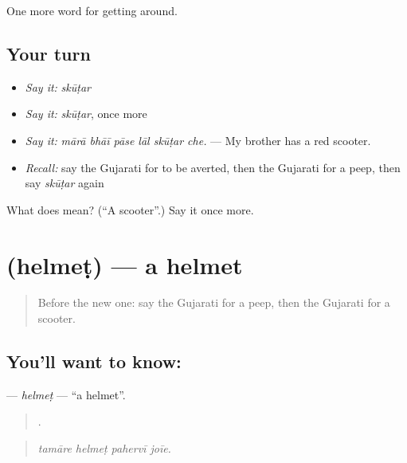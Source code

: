 \begin{grammarlens}[title={What you've built}]
One more word for getting around.
\end{grammarlens}

\subsection*{Your turn}
\begin{itemize}
\raggedright
  \item \emph{Say it:} \emph{skūṭar}
  \item \emph{Say it:} \emph{skūṭar}, once more
  \item \emph{Say it:} \emph{mārā bhāī pāse lāl skūṭar che.} — My brother has a red scooter.
  \item \emph{Recall:} say the Gujarati for to be averted, then the Gujarati for a peep, then say \emph{skūṭar} again
\end{itemize}

\begin{tcolorbox}[breakable,colback=teal!4,colframe=teal!35!black,title={Before you move on}]
What does  mean? (\textquotedblleft{}A scooter\textquotedblright{}.) Say it once more.
\end{tcolorbox}
\section[\texorpdfstring{\gu{હેલ્મેટ} (helmeṭ)}{હેલ્મેટ (helmeṭ)}]{ (helmeṭ) — a helmet}

\label{lesson:GU-C400-helmet}



\begin{quote}
Before the new one: say the Gujarati for a peep, then the Gujarati for a scooter.
\end{quote}

\subsection*{You'll want to know: }
\textbf{} — \emph{helmeṭ} — \textquotedblleft{}a helmet\textquotedblright{}.

\begin{quote}
   .
\end{quote}

\begin{quote}
\emph{tamāre helmeṭ pahervī joīe.}
\end{quote}

